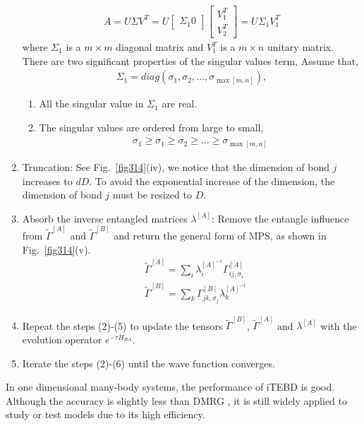 \begin{enumerate}
\begin{align}
	A = U \Sigma V^T = U \begin{bmatrix} \Sigma_1 0 \end{bmatrix} \begin{bmatrix} V_1^T \\ V_2^T \end{bmatrix} = U \Sigma_1 V_1^T
\end{align}
where $\Sigma_1$ is a $m \times m$ diagonal matrix and $V_1^T$ is a $m \times n$ unitary matrix. There are two significant properties of the singular values term, Assume that,
\begin{align}
\Sigma_1 = diag \left(\sigma_1, \sigma_2, \dots, \sigma_{\max{[m,n]}} \right), 
\end{align}
\begin{enumerate}
	\item All the singular value in $\Sigma_1$ are real.
	\item The singular values are ordered from large to small,
		\begin{align}
			\sigma_1 \geq \sigma_1 \geq \sigma_2 \geq \dots \geq \sigma_{\max{[m,n]}}
		\end{align}
\end{enumerate}
		\item Truncation: See Fig.~\ref{fig314}(iv), we notice that the dimension of bond $j$ increases to $dD$. To avoid the exponential increase of the dimension, the dimension of bond $j$ must be resized to $D$.
		\item Absorb the inverse entangled matrices $\lambda^{[A]}$: Remove the entangle influence from $\widetilde{\Gamma}^{[A]}$ and $\widetilde{\Gamma}^{[B]}$ and return the general form of MPS, as shown in Fig.~\ref{fig314}(v).
			\begin{align}
				&\widetilde{\Gamma}^{[A]} = \sum_{i}{ \lambda_{i}^{[A]^{-1}} \Gamma^{[A]}_{ij,\sigma_i}} \\
				&\widetilde{\Gamma}^{[B]} = \sum_{k}{\Gamma^{[B]}_{jk,\sigma_j} \lambda_{k}^{[A]^{-1}}}
			\end{align}
		\item Repeat the steps (2)-(5) to update the tensors $\widetilde{\Gamma}^{[B]}$, $\widetilde{\Gamma}^{[A]}$ and $\lambda^{[A]}$ with the evolution operator $e^{-\tau H_{BA}}$.
		\item Iterate the steps (2)-(6) until the wave function converges.
\end{enumerate}

In one dimensional many-body systems, the performance of iTEBD is good. Although the accuracy is slightly less than DMRG \cite{PhysRevB.48.10345}, it is still widely applied to study or test models due to its high efficiency.

